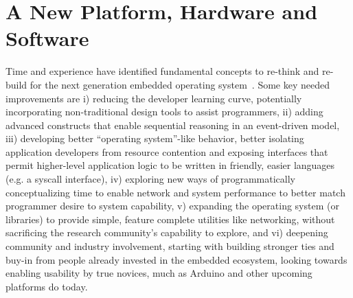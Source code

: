\section{A New Platform, Hardware and Software}


Time and experience have identified fundamental concepts to re-think and
re-build for the next generation embedded operating
system~\cite{tinyos-retrospective}. Some key needed improvements are
i) reducing the developer learning curve, potentially
incorporating non-traditional design tools to assist
programmers, %
ii) adding advanced constructs that enable sequential reasoning in an 
event-driven model, iii) developing
better ``operating system''-like behavior, better isolating application
developers from resource contention and exposing interfaces that permit
higher-level application logic to be written in friendly, easier languages
(e.g. a syscall interface), iv) exploring new ways of programmatically
conceptualizing time to enable network and system performance to better match
programmer desire to system capability, v) expanding the operating system 
(or libraries)
to provide simple, feature complete utilities
like networking, without sacrificing the research community's capability to
explore, and vi) deepening community and industry involvement, starting with
building stronger ties and buy-in from people already invested in the embedded
ecosystem, looking towards enabling usability by true novices, much as
Arduino and other upcoming platforms do today.

%




